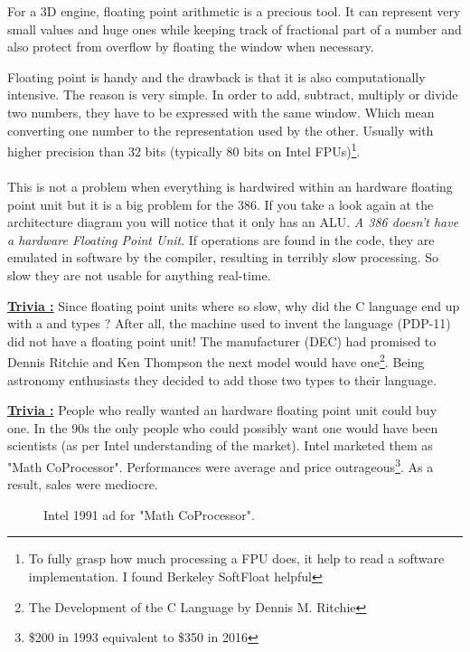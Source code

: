 \documentclass[book.tex]{subfiles}
\begin{document}
For a 3D engine, floating point arithmetic is a precious tool. It can represent very small values and huge ones while keeping track of fractional part of a number and also protect from overflow by floating the window when necessary.\\
\par
Floating point is handy and the drawback is that it is also computationally intensive. The reason is very simple. In order to add, subtract, multiply or divide two numbers, they have to be expressed with the same window. Which mean converting one number to the representation used by the other. Usually with higher precision than 32 bits (typically 80 bits on Intel FPUs)\footnote{To fully grasp how much processing a FPU does, it help to read a software implementation. I found Berkeley SoftFloat helpful}.\\
\\
This is not a problem when everything is hardwired within an hardware floating point unit but it is a big problem for the 386. If you take a look again at the architecture diagram you will notice that it only has an ALU. \emph{A 386 doesn't have a hardware Floating Point Unit}. If  operations are found in the code, they are emulated in software by the compiler, resulting in terribly slow processing. So slow they are not usable for anything real-time.\\ 
\par


 \textbf{\underline{Trivia :}} Since floating point units where so slow, why did the C language end up with a  and  types ? After all, the machine used to invent the language (PDP-11) did not have a floating point unit! The manufacturer (DEC) had promised to Dennis Ritchie and Ken Thompson the next model would have one\footnote{The Development of the C Language by Dennis M. Ritchie}. Being astronomy enthusiasts they decided to add those two types to their language.\\
\par


\textbf{\underline{Trivia :}} People who really wanted an hardware floating point unit could buy one. In the 90s the only people who could possibly want one would have been scientists (as per Intel understanding of the market). Intel marketed them as "Math CoProcessor". Performances were average and price outrageous\footnote{\$200 in 1993 equivalent to \$350 in 2016}. As a result, sales were mediocre.\\
\begin{figure}[H]
\centering
\caption{Intel 1991 ad for "Math CoProcessor".}
\label{fig:fp_internals}
\end{figure}
\end{document}
